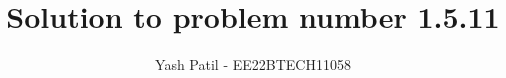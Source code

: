 \documentclass[journal,12pt,twocolumn]{IEEEtran}
\theoremstyle{remark}
\begin{document}
%




\vspace{3cm}

\title{
    Solution to problem number 1.5.11
}
\author{ Yash Patil - EE22BTECH11058}


%
%
%

% 
%



% 
\end{document}
